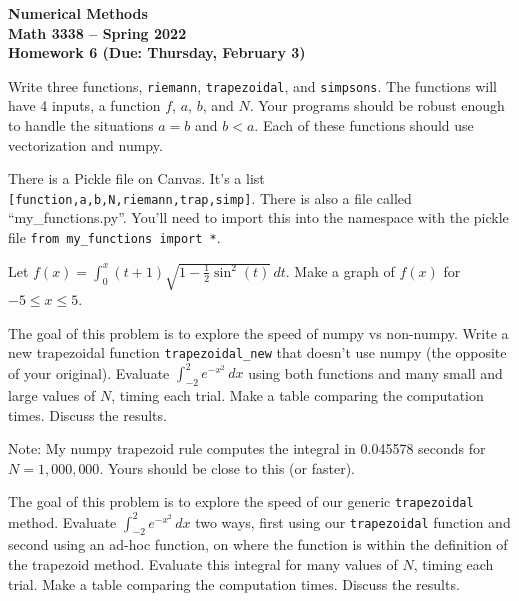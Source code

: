\documentclass[11pt,letterpaper]{article}
\newcommand{\semester}{Spring 2022}
\newcommand{\due}{Thursday, February 3}
\begin{document}
\newpage

\begin{center}
{\huge{\bf  Numerical Methods}} \\[1.5ex]
{\bf Math 3338 -- \semester}\\[1.5ex]
{\Large{\bf Homework 6 (Due: \due)}}\\
\end{center}
\vspace{2mm}



\begin{problem}
Write three functions, \texttt{riemann}, \texttt{trapezoidal}, and \texttt{simpsons}. The functions
will have 4 inputs, a function $f$, $a$, $b$, and $N$. Your programs should be robust enough to 
handle the situations $a=b$ and $b<a$. Each of these functions should use vectorization and numpy. 

There is a Pickle file on Canvas. It's a list \texttt{[function,a,b,N,riemann,trap,simp]}. There is also a file called ``my\_functions.py''. You'll need to import this into the namespace with the pickle file \texttt{from my\_functions import *}.
\end{problem}


\begin{problem}
Let $f(x) = \int_0^x (t+1)\sqrt{1-\frac{1}{2}\sin^2(t)}\,dt$. Make a graph of $f(x)$ for 
$-5\le x\le 5$.
\end{problem}



\begin{problem}
The goal of this problem is to explore the speed of numpy vs non-numpy. Write a new trapezoidal
function \texttt{trapezoidal\_new} that doesn't use numpy (the opposite of your
original). Evaluate $\int_{-2}^2 e^{-x^2}\,dx$ using both functions and many small and large 
values of $N$, timing each trial. Make a table comparing the computation times. Discuss the results.

Note: My numpy trapezoid rule computes the integral in 0.045578 seconds for $N=1,000,000$. Yours 
should be close to this (or faster).
\end{problem}

\begin{problem}
The goal of this problem is to explore the speed of our generic \texttt{trapezoidal} method. 
Evaluate $\int_{-2}^2 e^{-x^2}\,dx$ two ways, first using our \texttt{trapezoidal} function and
second using an ad-hoc function, on where the function is within the definition of the trapezoid method. Evaluate this integral for many values of $N$, timing each trial. Make a table comparing the computation times. Discuss
the results.
\end{problem}
\end{document}
